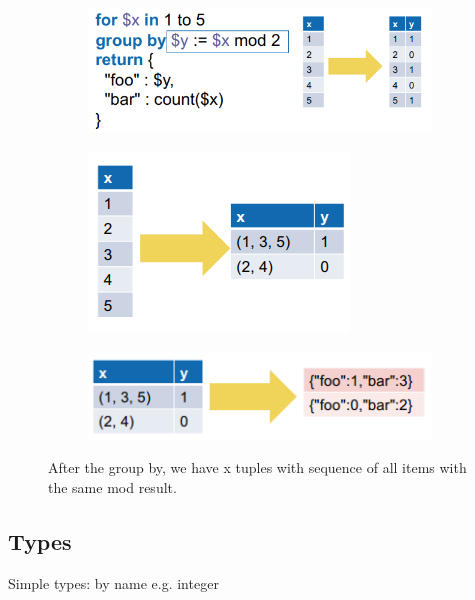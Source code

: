 \documentclass[11pt,oneside,a4paper]{article}
\begin{document}
{\begin{figure}[t!]
	\centering
	\begin{subfigure}[t]{.3\textwidth}
		\centering
		\includegraphics[width=1\linewidth]{figures/queryingtrees_tuples_31}
	\end{subfigure}%
	\begin{subfigure}[t]{.3\textwidth}
		\centering
		\includegraphics[width=0.6\linewidth]{figures/queryingtrees_tuples_32}
	\end{subfigure}
	\begin{subfigure}[t]{.3\textwidth}
		\centering
		\includegraphics[width=0.9\linewidth]{figures/queryingtrees_tuples_33}
	\end{subfigure}
	\caption{After the group by, we have x tuples with sequence of all items with the same mod result.}
\end{figure}

\newpage

\subsection{Types}

Simple types: by name e.g. integer

}
\end{document}
